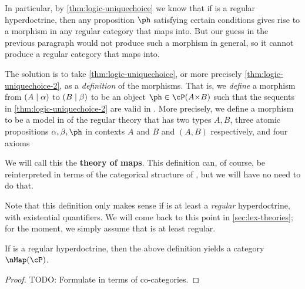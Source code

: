 \begin{wip}
In particular, by \cref{thm:logic-uniquechoice} we know that if \cP is a regular hyperdoctrine, then any proposition $\ph$ satisfying certain conditions gives rise to a morphism in any regular category that \cP maps into.
But our guess in the previous paragraph would not produce such a morphism in general, so it cannot produce a regular category that \cP maps into.

The solution is to take \cref{thm:logic-uniquechoice}, or more precisely \cref{thm:logic-uniquechoice-2}, as a \emph{definition} of the morphisms.
That is, we \emph{define} a morphism from $(A\mid\alpha)$ to $(B\mid\beta)$ to be an object $\ph\in \cP(A\times B)$ such that the sequents in \cref{thm:logic-uniquechoice-2} are valid in \cP.
More precisely, we define a morphism to be a model in \cP of the regular theory that has two types $A,B$, three atomic propositions $\alpha,\beta,\ph$ in contexts $A$ and $B$ and $(A,B)$ respectively, and four axioms
We will call this the \textbf{theory of maps}.
This definition can, of course, be reinterpreted in terms of the categorical structure of \cP, but we will have no need to do that.

Note that this definition only makes sense if \cP is at least a \emph{regular} hyperdoctrine, with existential quantifiers.
We will come back to this point in \cref{sec:lex-theories}; for the moment, we simply assume that \cP is at least regular.

\begin{thm}\label{thm:hdmap-cat}
  If \cP is a regular hyperdoctrine, then the above definition yields a category $\map(\cP)$.
\end{thm}
\begin{proof}
  TODO: Formulate in terms of co-categories.


\end{proof}
\end{wip}
